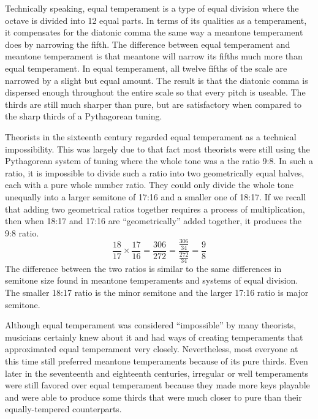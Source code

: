 Technically speaking, equal temperament is a type of equal division where the
octave is divided into 12 equal parts.  In terms of its qualities as a temperament,
it compensates for the diatonic comma the same way a meantone temperament does by
narrowing the fifth.  The difference between equal temperament and meantone
temperament is that meantone will narrow its fifths much more than equal
temperament.  In equal temperament, all twelve fifths of the scale are narrowed by a slight
but equal amount.  The result is that the diatonic comma is dispersed enough
throughout the entire scale so that every pitch is useable.  The thirds
are still much sharper than pure, but are satisfactory when compared to the sharp thirds
of a Pythagorean tuning.

Theorists in the sixteenth century regarded equal temperament as a technical impossibility.
This was largely due to that fact most theorists were still using the Pythagorean
system of tuning where the whole tone was a the ratio 9:8.  In such a ratio, it
is impossible to divide such a ratio into two geometrically equal halves, each with a pure
whole number ratio.
They could only divide the whole tone unequally into a larger semitone of 17:16
and a smaller one of 18:17. \autocite[20]{ML:1}  If we recall that adding two geometrical ratios
together requires a process of multiplication, then when 18:17 and 17:16 are ``geometrically''
added together, it produces the 9:8 ratio.
\begin{equation}
  \frac{18}{17} \times
  \frac{17}{16} =
  \frac{306}{272} =
  \frac{\frac{306}{34}}{\frac{272}{34}} =
  \frac{9}{8}
\end{equation}
The difference between the two ratios is similar to the same
differences in semitone size found in meantone temperaments and systems
of equal division.  The smaller 18:17 ratio is the minor semitone and the larger 17:16
ratio is major semitone.

Although equal temperament was considered ``impossible'' by many theorists, musicians
certainly knew about it and had ways of creating temperaments that approximated equal
temperament very closely.  Nevertheless, most everyone at this time still preferred
meantone temperaments because of its pure thirds.
Even later in the seventeenth and eighteenth centuries, irregular or well temperaments
were still favored over equal temperament because they made more keys playable and were able
to produce some thirds that were much closer to pure than their equally-tempered counterparts.

